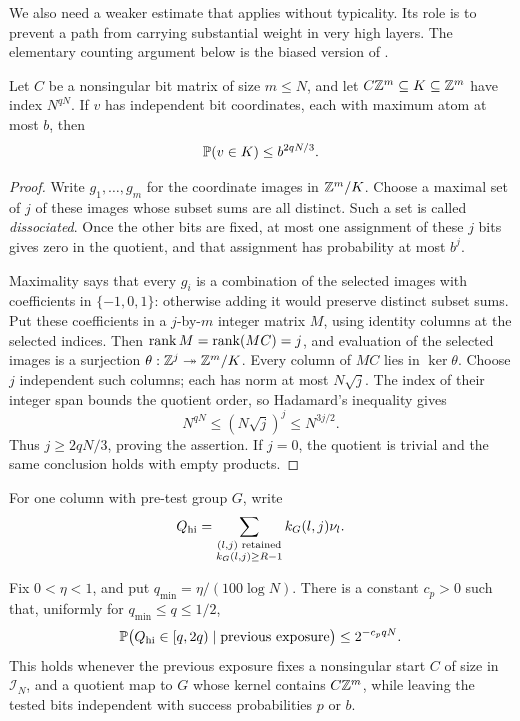 We also need a weaker estimate that applies without typicality. Its
role is to prevent a path from carrying substantial weight in very
high layers. The elementary counting argument below is the biased
version of \cite[Lemma 11.2]{SymmetricRate}.

\begin{lemma}\label{lem:path-dissociation}
Let \(C\) be a nonsingular bit matrix of size \(m\le N\), and let
\(C\mathbb Z^m\subseteq K\subseteq\mathbb Z^m\) have index \(N^{qN}\).
If \(v\) has independent bit coordinates, each with maximum atom
at most \(b\), then
\begin{equation}\label{eq:path-fixed-mask-cost}
 \mathbb P(v\in K)\le b^{2qN/3}.
\end{equation}
\end{lemma}

\begin{proof}
Write \(g_1,\ldots,g_m\) for the coordinate images in \(\mathbb Z^m/K\).
Choose a maximal set of \(j\) of these images whose subset sums
are all distinct. Such a set is called \emph{dissociated}. Once
the other bits are fixed, at most one assignment of these \(j\)
bits gives zero in the quotient, and that assignment has probability
at most \(b^j\).

Maximality says that every \(g_i\) is a combination of the selected
images with coefficients in \(\{-1,0,1\}\): otherwise adding it
would preserve distinct subset sums. Put these coefficients in a
\(j\)-by-\(m\) integer matrix \(M\), using identity columns at the
selected indices. Then \(\operatorname{rank} M=\operatorname{rank}(MC)=j\), and evaluation
of the selected images is a surjection
\(\theta:\mathbb Z^j\twoheadrightarrow\mathbb Z^m/K\). Every column of \(MC\)
lies in \(\ker\theta\). Choose \(j\) independent such columns;
each has norm at most \(N\sqrt j\). The index of their integer
span bounds the quotient order, so Hadamard's inequality gives
\[
 N^{qN}\le(N\sqrt j)^j\le N^{3j/2}.
\]
Thus \(j\ge2qN/3\), proving the assertion. If \(j=0\), the
quotient is trivial and the same conclusion holds with empty products.
\end{proof}

For one column with pre-test group \(G\), write
\begin{equation}\label{eq:path-heavy-weight}
 Q_{\rm hi}=\sum_{\substack{(l,j)\text{ retained}\\k_G(l,j)\ge R-1}}
                     k_G(l,j)\nu_l.
\end{equation}

\begin{lemma}\label{lem:path-heavy-cost}
Fix \(0<\eta<1\), and put \(q_{\min}=\eta/(100\log N)\).
There is a constant \(c_p>0\) such that, uniformly for
\(q_{\min}\le q\le1/2\),
\begin{equation}\label{eq:path-heavy-cost}
 \mathbb P\bigl(Q_{\rm hi}\in[q,2q)\mid\text{previous exposure}\bigr)
       \le2^{-c_pqN}.
\end{equation}
This holds whenever the previous exposure fixes a nonsingular start
\(C\) of size in \(\mathcal I_N\), and a quotient map to \(G\)
whose kernel contains \(C\mathbb Z^m\), while leaving the tested bits
independent with success probabilities \(p\) or \(b\).
\end{lemma}

